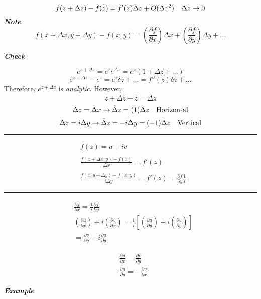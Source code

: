 \documentclass[svgnames]{article}   	%
\begin{document}
\vspace{5px} \[
f(z + \Delta z) - f(z) = f'(z)\Delta z + O(\Delta z^2) \hspace{10px} \Delta
z \rightarrow 0
\] \vspace{5px}
\textit{ \textbf{Note}}
\[
f(x + \Delta x, y + \Delta y) - f(x,y) = \left( \frac{\partial f}{\partial
  x}\right) \Delta x + \left( \frac{\partial f}{\partial y} \right) \Delta
  y + \dots 
\]

\textit{ \textbf{Check}}

\[
  e^{z + \Delta z} = e^ze^{\Delta z} = e^z ( 1 + \Delta z + \dots)
\]
\[
  e^{z + \Delta z} - e^z = e^z \delta z + \dots = f''(z) \delta z + \dots 
\]
\vspace{5px}
Therefore, $e^{z + \Delta z}$ is  \textit{analytic}.  However, 
\[
\bar z + \Delta \bar z - \bar z = \bar \Delta z
\]
\[
\Delta z = \Delta x \rightarrow \bar \Delta z = (1) \Delta z \hspace{10px}
\text{Horizontal}
\]
\[
\Delta z = i \Delta y \rightarrow \bar \Delta z = -i\Delta y = (-1)\Delta
z \hspace{10px} \text{Vertical}
\]
\vspace{5px}
\hrule
\begin{align*}
  &f(z) = u + iv \\\\
  &\frac{f(x + \Delta x, y) - f(x)}{\Delta x} = f'(z) \\\\
  &\frac{f(x, y + \Delta y) - f(x,y)}{i\Delta y} = f'(z) = \frac{\partial
  f}{\partial y} \frac{1}{i}
\end{align*}

\vspace{5px}
\hrule

\begin{align*}
  &\frac{\partial f}{\partial x}  = \frac{1}{i} \frac{\partial f}{\partial y} \\ 
  &\left( \frac{\partial u}{\partial x}\right) + i\left( \frac{\partial
    v}{\partial x} \right) = \frac{1}{i} \left[\left( \frac{\partial
      u}{\partial y} \right) + i \left( \frac{\partial v}{\partial y}
  \right)\right] \\ 
  &= \frac{\partial v}{\partial y}  - i \frac{\partial u}{\partial y} 
\end{align*}


\begin{tcolorbox}[colback = blue!5!white, colframe = blue!50!black, title
  = Cauchy Riemann Equations] 
  \begin{align*}
    &\frac{\partial u}{\partial x} = \frac{\partial v}{\partial y} \\
    &\frac{\partial u}{\partial y} = - \frac{\partial v}{\partial x} 
  \end{align*}

\end{tcolorbox}
\vspace{5px}
\textit{ \textbf{Example}}
\end{document}
